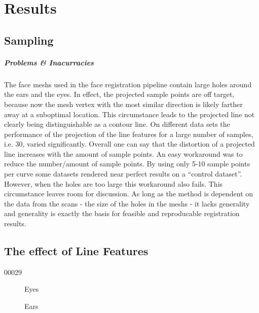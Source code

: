\chapter{Results}

\section{Sampling}
\paragraph{Problems \& Inacurracies}
The face meshs used in the face registration pipeline contain large holes around the ears and the eyes. In effect, the projected sample points are off target, because now the mesh vertex with the most similar direction is likely farther away at a suboptimal location. This circumstance leads to the projected line not clearly being distinguishable as a contour line. On different data sets the performance of the projection of the line features for a large number of
samples, i.e. 30, varied significantly. Overall one can say that the distortion of a projected line increases with the amount of sample points.
An easy workaround was to reduce the number/amount of sample points. By using only 5-10 sample points per curve some datasets rendered near perfect results on a ``control dataset''.  
However, when the holes are too large this workaround also fails. This circumstance leaves room for discussion. As long as the method is dependent on the data from the scans - the size of the holes in the meshs - it lacks generality and generality is exactly the basis for feasible and reproducable registration results.\\


\section{The effect of Line Features}
00029
\begin{figure}[h!]
\caption{Eyes}
\label{fig:fiteyes}
\end{figure}

\begin{figure}[h!]
    \subfloat[target]{}

\caption{Ears}
\label{fig:fitears}
\end{figure}

